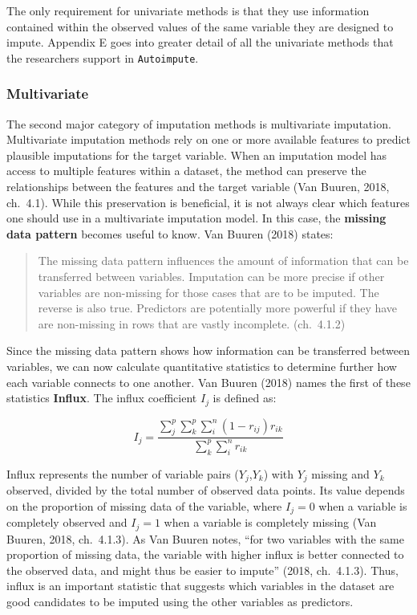 \documentclass[12pt,oneside]{chicagocapstone}
\begin{document}
The only requirement for univariate methods is that they use information
contained within the observed values of the same variable they are
designed to impute. Appendix E goes into greater detail of all the
univariate methods that the researchers support in \texttt{Autoimpute}.

\subsubsection*{Multivariate}\label{multivariate}

The second major category of imputation methods is multivariate
imputation. Multivariate imputation methods rely on one or more
available features to predict plausible imputations for the target
variable. When an imputation model has access to multiple features
within a dataset, the method can preserve the relationships between the
features and the target variable (Van Buuren, 2018, ch.~4.1). While this
preservation is beneficial, it is not always clear which features one
should use in a multivariate imputation model. In this case, the
\textbf{missing data pattern} becomes useful to know. Van Buuren (2018)
states:
\begin{quote}
The missing data pattern influences the amount of information that can
be transferred between variables. Imputation can be more precise if
other variables are non-missing for those cases that are to be imputed.
The reverse is also true. Predictors are potentially more powerful if
they have are non-missing in rows that are vastly incomplete.
(ch.~4.1.2)
\end{quote}
Since the missing data pattern shows how information can be transferred
between variables, we can now calculate quantitative statistics to
determine further how each variable connects to one another. Van Buuren
(2018) names the first of these statistics \textbf{Influx}. The influx
coefficient \(I_j\) is defined as:

\[I_j = \frac{\sum_j^p\sum_k^p\sum_i^n (1-r_{ij})r_{ik}}{\sum_k^p\sum_i^n r_{ik}}\]

Influx represents the number of variable pairs (\(Y_j\),\(Y_k\)) with
\(Y_j\) missing and \(Y_k\) observed, divided by the total number of
observed data points. Its value depends on the proportion of missing
data of the variable, where \(I_j=0\) when a variable is completely
observed and \(I_j=1\) when a variable is completely missing (Van
Buuren, 2018, ch.~4.1.3). As Van Buuren notes, ``for two variables with
the same proportion of missing data, the variable with higher influx is
better connected to the observed data, and might thus be easier to
impute'' (2018, ch.~4.1.3). Thus, influx is an important statistic that
suggests which variables in the dataset are good candidates to be
imputed using the other variables as predictors.
\end{document}
